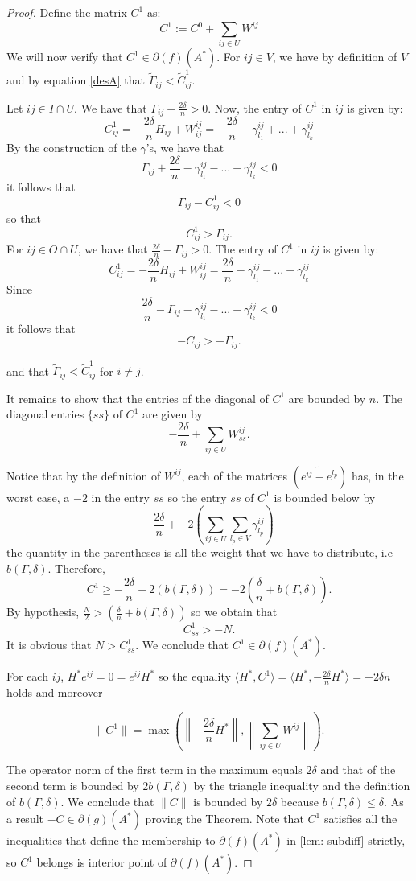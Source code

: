 \documentclass[12pt]{amsart}
\theoremstyle{remark}
\begin{document}
\begin{proof}
Define the matrix $C^1$ as:
\[C^1:= C^0 + \sum_{ij \in U} W^{ij} \]
We will now verify that $C^1 \in \partial(f)(A^*)$.
For $ij \in V$, we have by definition of $V$ and by equation \ref{desA} that $\widetilde{\Gamma}_{ij}< \widetilde{C}^1_{ ij}$.  

Let $ij \in I\cap U$. We have that $\Gamma_{ij}+\frac{2\delta}{n}>0$.
Now, the entry of $C^1$ in $ij$ is given by:
\[
C^1_{ij} = -\frac{2\delta}{n}H_{ij}+W^{ij}_{ij} = - \frac{2\delta}{n}+\gamma^{ij}_{l_1}+...+\gamma^{ij}_{l_k}
\]
By the construction of the $\gamma$'s, we have that
\[
\Gamma_{ij}+\frac{2\delta}{n}-\gamma^{ij}_{l_1}-...-\gamma^{ij}_{l_k}<0
\]
it follows that 
\[
\Gamma_{ij}-C^1_{ij}<0
\]
so that
\[
C^1_{ij}>\Gamma_{ij}.
\]
For $ij \in O\cap U$, we have that $\frac{2\delta}{n}-\Gamma_{ij}>0$.
The entry of $C^1$ in $ij$ is given by:
\[
C^1_{ij}=-\frac{2\delta}{n}H_{ij}+W^{ij}_{ij} = \frac{2\delta}{n}-\gamma^{ij}_{l_1}-...-\gamma^{ij}_{l_k}
\]
Since
\[
\frac{2\delta}{n}-\Gamma_{ij}-\gamma^{ij}_{l_1}-...-\gamma^{ij}_{l_k}<0
\]
it follows that
\[
-C_{ij}>-\Gamma_{ij}.
\]

and that $\widetilde{\Gamma}_{ij} < \widetilde{C}^1_{ ij}$ for $i\neq j$. 

It remains to show that the entries of the diagonal of $C^1$ are bounded by $n$. The diagonal entries $\{ss\}$ of $C^1$ are given by
\[
-\frac{2\delta}{n}+ \sum_{ij\in U} W^{ij}_{ss}.
\]


Notice that by the definition of $W^{ij}$, each of the matrices $(\widetilde{e^{ij}-e^{l_p}} )$ has, in the worst case, a $-2$ in the entry $ss$ so the entry $ss$ of $C^1$ is bounded below by 
\[
-\frac{2\delta}{n}+-2 \left(\sum_{ij\in U}\sum_{l_p \in V} \gamma_{l_p}^{ij}\right)
\]
the quantity in the parentheses is all the weight that we have to distribute, i.e $b(\Gamma,\delta)$.
Therefore, 
\[
C^1 \geq -\frac{2\delta}{n}-2(b(\Gamma,\delta)) =-2\left(\frac{\delta}{n}+b(\Gamma,\delta)\right).
\]
By hypothesis, $ \frac{N}{2} > \left(\frac{\delta}{n}+b(\Gamma,\delta) \right) $ so we obtain that
\[
C^1_{ss} > -N.
\]
It is obvious that $N > C^1_{ss}$.
We conclude that $C^1 \in \partial(f)(A^*)$.

For each $ij$, $H^*e^{ij}=0=e^{ij}H^*$ so the equality $\langle H^*, C^1\rangle =\langle H^*,-\frac{2\delta}{n}H^*\rangle = -2\delta n$ holds and moreover

\[ \| C^1\|=\max\left(\left\|-\frac{2\delta}{n}H^*\right\|, \left\|\sum_{ij\in U} W^{ij} \right\|\right).
\]


The operator norm of the first term in the maximum equals $2\delta$ and that of the second term is bounded by $2b(\Gamma,\delta)$ by the triangle inequality and the definition of $b(\Gamma,\delta)$. We conclude that $\|C\|$ is bounded by $2\delta$ because $b(\Gamma,\delta)\leq \delta$. As a result $-C\in \partial\left(g\right)(A^*)$ proving the Theorem. Note that $C^1$ satisfies all the inequalities that define the membership to $\partial(f)(A^*)$ in \ref{lem: subdiff} strictly, so $C^1$ belongs is interior point of $\partial(f)(A^*)$.





\end{proof}
\end{document}
